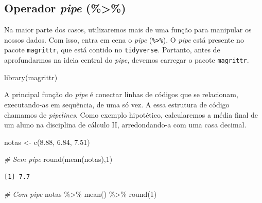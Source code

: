 \documentclass[
  brazilian,
]{book}
\newenvironment{Shaded}{\begin{snugshade}}{\end{snugshade}}
\newcommand{\CommentTok}[1]{\textcolor[rgb]{0.56,0.35,0.01}{\textit{#1}}}
\newcommand{\DecValTok}[1]{\textcolor[rgb]{0.00,0.00,0.81}{#1}}
\newcommand{\FloatTok}[1]{\textcolor[rgb]{0.00,0.00,0.81}{#1}}
\newcommand{\FunctionTok}[1]{\textcolor[rgb]{0.00,0.00,0.00}{#1}}
\newcommand{\NormalTok}[1]{#1}
\newcommand{\OtherTok}[1]{\textcolor[rgb]{0.56,0.35,0.01}{#1}}
\newcommand{\SpecialCharTok}[1]{\textcolor[rgb]{0.00,0.00,0.00}{#1}}
\begin{document}
\hypertarget{operador-pipe}{%
\subsection{\texorpdfstring{Operador \emph{pipe} (\%\textgreater\%)}{Operador pipe (\%\textgreater\%)}}\label{operador-pipe}}

Na maior parte dos casos, utilizaremos mais de uma função para manipular os nossos dados. Com isso, entra em cena o \emph{pipe} (\texttt{\%\textgreater{}\%}). O \emph{pipe} está presente no pacote \texttt{magrittr}, que está contido no \texttt{tidyverse}. Portanto, antes de aprofundarmos na ideia central do \emph{pipe}, devemos carregar o pacote \texttt{magrittr}.

\begin{Shaded}
\begin{Highlighting}[]
\FunctionTok{library}\NormalTok{(magrittr)}
\end{Highlighting}
\end{Shaded}

A principal função do \emph{pipe} é conectar linhas de códigos que se relacionam, executando-as em sequência, de uma só vez. A essa estrutura de código chamamos de \emph{pipelines}. Como exemplo hipotético, calcularemos a média final de um aluno na disciplina de cálculo II, arredondando-a com uma casa decimal.

\begin{Shaded}
\begin{Highlighting}[]
\NormalTok{notas }\OtherTok{\textless{}{-}} \FunctionTok{c}\NormalTok{(}\FloatTok{8.88}\NormalTok{, }\FloatTok{6.84}\NormalTok{, }\FloatTok{7.51}\NormalTok{)}

\CommentTok{\# Sem pipe}
\FunctionTok{round}\NormalTok{(}\FunctionTok{mean}\NormalTok{(notas),}\DecValTok{1}\NormalTok{)}
\end{Highlighting}
\end{Shaded}

\begin{verbatim}
[1] 7.7
\end{verbatim}

\begin{Shaded}
\begin{Highlighting}[]
\CommentTok{\# Com pipe}
\NormalTok{notas }\SpecialCharTok{\%\textgreater{}\%} \FunctionTok{mean}\NormalTok{() }\SpecialCharTok{\%\textgreater{}\%} \FunctionTok{round}\NormalTok{(}\DecValTok{1}\NormalTok{)}
\end{Highlighting}
\end{Shaded}
\end{document}
